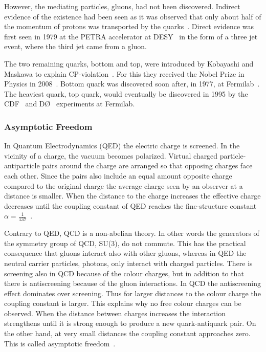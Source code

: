 However, the mediating particles, gluons, had not been discovered. Indirect evidence of the existence had been seen as it was observed that only about half of the momentum of protons was transported by the quarks~\cite{25gluons}. Direct evidence was first seen in 1979 at the PETRA accelerator at DESY~\cite{Brandelik:1979bd, PhysRev.43.830, Berger1979418} in the form of a three jet event, where the third jet came from a gluon.

The two remaining quarks, bottom and top, were introduced by Kobayashi and Maskawa to explain CP-violation~\cite{Kobayashi:1973fv}. For this they received the Nobel Prize in Physics in 2008~\cite{Nobel2008}. Bottom quark was discovered soon after, in 1977, at Fermilab~\cite{Herb:1977ek}. The heaviest quark, top quark, would eventually be discovered in 1995 by the CDF~\cite{Abe:1995hr} and DØ~\cite{Abachi:1994td} experiments at Fermilab.




\subsubsection{Asymptotic Freedom}
In Quantum Electrodynamics (QED) the electric charge is screened. In the vicinity of a charge, the vacuum becomes polarized. Virtual charged particle-antiparticle pairs around the charge are arranged so that opposing charges face each other. Since the pairs also include an equal amount opposite charge compared to the original charge the average charge seen by an observer at a distance is smaller. When the distance to the charge increases the effective charge decreases until the coupling constant of QED reaches the fine-structure constant $\alpha=\frac{1}{137}$~\cite{Perkins:1982xb}.

Contrary to QED, QCD is a non-abelian theory. In other words the generators of the symmetry group of QCD, SU(3), do not commute. This has the practical consequence that gluons interact also with other gluons, whereas in QED the neutral carrier particles, photons, only interact with charged particles.
There is screening also in QCD because of the colour charges, but in addition to that there is antiscreening because of the gluon interactions. In QCD the antiscreening effect dominates over screening. Thus for larger distances to the colour charge the coupling constant is larger. This explains why no free colour charges can be observed. When the distance between charges increases the interaction strengthens until it is strong enough to produce a new quark-antiquark pair. On the other hand, at very small distances the coupling constant approaches zero. This is called asymptotic freedom~\cite{Perkins:1982xb}.

